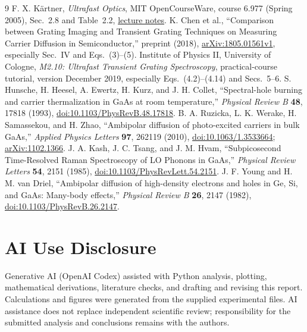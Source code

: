 \documentclass[11pt,a4paper]{article}
\begin{document}



\begin{thebibliography}{9}
 F. X. Kärtner, \emph{Ultrafast Optics}, MIT OpenCourseWare, course 6.977 (Spring 2005), Sec.~2.8 and Table~2.2, \href{https://ocw.mit.edu/courses/6-977-ultrafast-optics-spring-2005/f806ff596f9bffb74003360e2c05c086_MIT6_977S05_textbook.pdf}{lecture notes}.
 K. Chen et al., ``Comparison between Grating Imaging and Transient Grating Techniques on Measuring Carrier Diffusion in Semiconductor,'' preprint (2018), \href{https://arxiv.org/abs/1805.01561}{arXiv:1805.01561v1}, especially Sec.~IV and Eqs.~(3)--(5).
 Institute of Physics II, University of Cologne, \emph{M2.10: Ultrafast Transient Grating Spectroscopy}, practical-course tutorial, version December 2019, especially Eqs.~(4.2)--(4.14) and Secs.~5--6.
 S. Hunsche, H. Heesel, A. Ewertz, H. Kurz, and J. H. Collet, ``Spectral-hole burning and carrier thermalization in GaAs at room temperature,'' \emph{Physical Review B} \textbf{48}, 17818 (1993), \href{https://doi.org/10.1103/PhysRevB.48.17818}{doi:10.1103/PhysRevB.48.17818}.
 B. A. Ruzicka, L. K. Werake, H. Samassekou, and H. Zhao, ``Ambipolar diffusion of photo-excited carriers in bulk GaAs,'' \emph{Applied Physics Letters} \textbf{97}, 262119 (2010), \href{https://doi.org/10.1063/1.3533664}{doi:10.1063/1.3533664}; \href{https://arxiv.org/abs/1102.1366}{arXiv:1102.1366}.
 J. A. Kash, J. C. Tsang, and J. M. Hvam, ``Subpicosecond Time-Resolved Raman Spectroscopy of LO Phonons in GaAs,'' \emph{Physical Review Letters} \textbf{54}, 2151 (1985), \href{https://doi.org/10.1103/PhysRevLett.54.2151}{doi:10.1103/PhysRevLett.54.2151}.
 J. F. Young and H. M. van Driel, ``Ambipolar diffusion of high-density electrons and holes in Ge, Si, and GaAs: Many-body effects,'' \emph{Physical Review B} \textbf{26}, 2147 (1982), \href{https://doi.org/10.1103/PhysRevB.26.2147}{doi:10.1103/PhysRevB.26.2147}.
\end{thebibliography}

\section*{AI Use Disclosure}
Generative AI (OpenAI Codex) assisted with Python analysis, plotting, mathematical derivations, literature checks, and drafting and revising this report. Calculations and figures were generated from the supplied experimental files. AI assistance does not replace independent scientific review; responsibility for the submitted analysis and conclusions remains with the authors.
\end{document}
